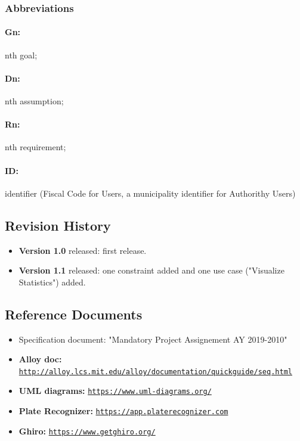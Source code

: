 \documentclass{article}
\begin{document}
\subsubsection{Abbreviations}
\paragraph{Gn:} nth goal; \paragraph{Dn:} nth assumption; \paragraph{Rn:} nth
requirement; \paragraph{ID: } identifier (Fiscal Code for Users, a
municipality identifier for Authorithy Users)
\subsection{Revision History}
\begin{itemize}
    \item \textbf{Version 1.0} released: first release.
    \item \textbf{Version 1.1} released: one constraint added and one use case ("Visualize Statistics") added.
\end{itemize}
\subsection{Reference Documents}
\begin{itemize}
    \item Specification document: "Mandatory Project Assignement AY 2019-2010"
    \item \textbf{Alloy doc:}
    \href{http://alloy.lcs.mit.edu/alloy/documentation/quickguide/seq.html}{\texttt{http://alloy.lcs.mit.edu/alloy/documentation/quickguide/seq.html}}
    \item \textbf{UML diagrams:} \href{https://www.uml-diagrams.org/}{\texttt{https://www.uml-diagrams.org/}}
    \item \textbf{Plate Recognizer:} \href{https://app.platerecognizer.com}{\texttt{https://app.platerecognizer.com}}
    \item \textbf{Ghiro:} \href{https://www.getghiro.org/}{\texttt{https://www.getghiro.org/}}
\end{itemize}
\newpage
\end{document}
